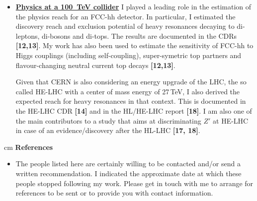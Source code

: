 \documentclass[12pt]{article}
\begin{document}
\begin{itemize}[leftmargin=1.3cm]
\item[] {\bf \underline{Physics at a 100~TeV collider}}
\vskip 0.2cm
I played a leading role in the estimation of the physics reach for an FCC-hh detector. In particular, I estimated the discovery reach and exclusion potential of heavy resonances decaying to di-leptons, di-bosons and di-tops. The results are documented in the CDRs {\bf \color{red}[12,13]}. My work has also been used to estimate the sensitivity of FCC-hh to Higgs couplings (including self-coupling), super-symetric top partners and flavour-changing neutral current top decays {\bf \color{red}[12,13]}.

Given that CERN is also considering an energy upgrade of the LHC, the so called HE-LHC with a center of mass energy of 27\,TeV, I also derived the expected reach for heavy resonances in that context. This is documented in the HE-LHC CDR {\bf \color{red}[14]} and in the HL/HE-LHC report {\bf \color{red}[18]}. I am also one of the main contributors to a study that aims at discriminating $Z'$ at HE-LHC in case of an evidence/discovery after the HL-LHC {\bf \color{red}[17, 18]}. 

 \vspace{2.5mm}





\end{itemize}




 cm
{\bf \large References}
\vskip 0.2cm
\begin{itemize}[leftmargin=1.3cm]
\item[] The people listed here are certainly willing to be contacted and/or send a written recommendation. I indicated the approximate date at which these people stopped following my work. Please get in touch with me to arrange for references to be sent or to provide you with contact information.
\end{itemize}
\newpage
\end{document}
